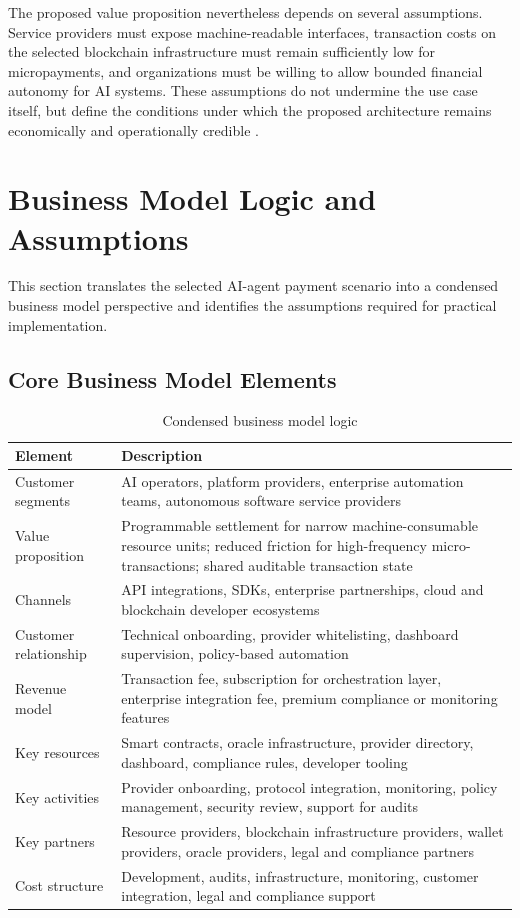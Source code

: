\documentclass[12pt,a4paper,oneside]{article}
\theoremstyle{definition}
\theoremstyle{plain}
\begin{document}
The proposed value proposition nevertheless depends on several assumptions. Service providers must expose machine-readable interfaces, transaction costs on the selected blockchain infrastructure must remain sufficiently low for micropayments, and organizations must be willing to allow bounded financial autonomy for AI systems. These assumptions do not undermine the use case itself, but define the conditions under which the proposed architecture remains economically and operationally credible \citep{krueger2026workshop4}.

\section{Business Model Logic and Assumptions}

This section translates the selected AI-agent payment scenario into a condensed business model perspective and identifies the assumptions required for practical implementation.

\subsection{Core Business Model Elements}

\begin{table}[H]
\centering
\caption{Condensed business model logic}
\label{tab:bmc}
\begin{tabular}{p{4.0cm}p{10.0cm}}
\toprule
\textbf{Element} & \textbf{Description} \\
\midrule
Customer segments & AI operators, platform providers, enterprise automation teams, autonomous software service providers \\
Value proposition & Programmable settlement for narrow machine-consumable resource units; reduced friction for high-frequency micro-transactions; shared auditable transaction state \\
Channels & API integrations, SDKs, enterprise partnerships, cloud and blockchain developer ecosystems \\
Customer relationship & Technical onboarding, provider whitelisting, dashboard supervision, policy-based automation \\
Revenue model & Transaction fee, subscription for orchestration layer, enterprise integration fee, premium compliance or monitoring features \\
Key resources & Smart contracts, oracle infrastructure, provider directory, dashboard, compliance rules, developer tooling \\
Key activities & Provider onboarding, protocol integration, monitoring, policy management, security review, support for audits \\
Key partners & Resource providers, blockchain infrastructure providers, wallet providers, oracle providers, legal and compliance partners \\
Cost structure & Development, audits, infrastructure, monitoring, customer integration, legal and compliance support \\
\bottomrule
\end{tabular}
\end{table}
\end{document}
